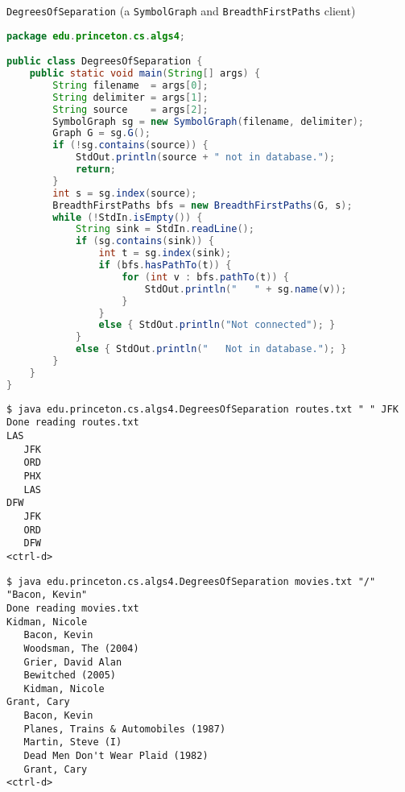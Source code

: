 \documentclass[8pt,a4paper,compress]{beamer}
\begin{document}
\begin{frame}[fragile]
\pause

\lstinline{DegreesOfSeparation} (a \lstinline{SymbolGraph} and \lstinline{BreadthFirstPaths} client)

\begin{lstlisting}[language=Java]
package edu.princeton.cs.algs4;

public class DegreesOfSeparation {
    public static void main(String[] args) {
        String filename  = args[0];
        String delimiter = args[1];
        String source    = args[2];
        SymbolGraph sg = new SymbolGraph(filename, delimiter);
        Graph G = sg.G();
        if (!sg.contains(source)) {
            StdOut.println(source + " not in database.");
            return;
        }
        int s = sg.index(source);
        BreadthFirstPaths bfs = new BreadthFirstPaths(G, s);
        while (!StdIn.isEmpty()) {
            String sink = StdIn.readLine();
            if (sg.contains(sink)) {
                int t = sg.index(sink);
                if (bfs.hasPathTo(t)) {
                    for (int v : bfs.pathTo(t)) {
                        StdOut.println("   " + sg.name(v));
                    }
                }
                else { StdOut.println("Not connected"); }
            }
            else { StdOut.println("   Not in database."); }
        }
    }
}
\end{lstlisting}
\end{frame}

\begin{frame}[fragile]
\pause

\begin{lstlisting}[language={}]
$ java edu.princeton.cs.algs4.DegreesOfSeparation routes.txt " " JFK
Done reading routes.txt
LAS
   JFK
   ORD
   PHX
   LAS
DFW
   JFK
   ORD
   DFW
<ctrl-d>
\end{lstlisting}

\pause

\begin{lstlisting}[language={}]
$ java edu.princeton.cs.algs4.DegreesOfSeparation movies.txt "/" "Bacon, Kevin"
Done reading movies.txt
Kidman, Nicole
   Bacon, Kevin
   Woodsman, The (2004)
   Grier, David Alan
   Bewitched (2005)
   Kidman, Nicole
Grant, Cary
   Bacon, Kevin
   Planes, Trains & Automobiles (1987)
   Martin, Steve (I)
   Dead Men Don't Wear Plaid (1982)
   Grant, Cary
<ctrl-d>
\end{lstlisting}
\end{frame}
\end{document}
